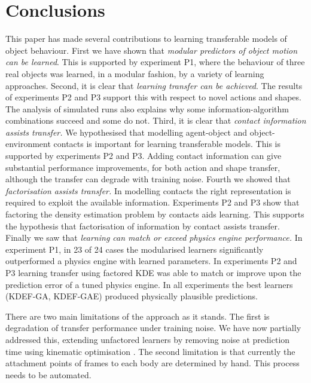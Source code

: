 
\section{Conclusions}\label{sec:Discussion}

This paper has made several contributions to learning transferable models of object behaviour. First we have shown that {\em modular predictors of object motion can be learned}. This is supported by experiment P1, where the behaviour of three real objects was learned, in a modular fashion, by a variety of learning approaches. Second, it is clear that {\em learning transfer can be achieved}. The results of experiments P2 and P3 support this with respect to novel actions and shapes. The analysis of simulated runs also explains why some information-algorithm combinations succeed and some do not. Third, it is clear that {\em contact information assists transfer.} We hypothesised that modelling agent-object and object-environment contacts is important for learning transferable models. This is supported by experiments P2 and P3. Adding contact information can give substantial performance improvements, for both action and shape transfer, although the transfer can degrade with training noise. Fourth we showed that {\em factorisation assists transfer.} In modelling contacts the right representation is required to exploit the available information. Experiments P2 and P3 show that factoring the density estimation problem by contacts aids learning. This supports the hypothesis that factorisation of information by contact assists transfer.
Finally we saw that {\em learning can match or exceed physics engine performance.} In experiment P1, in 23 of 24 cases the modularised learners significantly outperformed a physics engine with learned parameters. In experiments P2 and P3 learning transfer using factored KDE was able to match or improve upon the prediction error of a tuned physics engine. In all experiments the best learners (KDEF-GA, KDEF-GAE) produced physically plausible predictions. 

There are two main limitations of the approach as it stands. The first is degradation of transfer performance under training noise. We have now partially addressed this, extending unfactored learners by removing noise at prediction time using kinematic optimisation \cite{belter2014iros}. The second limitation is that currently the attachment points of frames to each body are determined by hand. This process needs to be automated.

